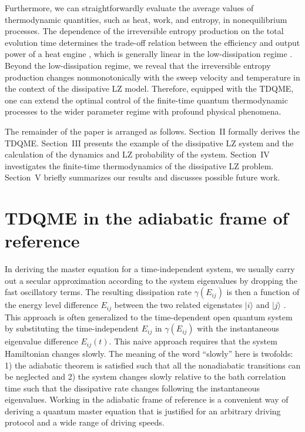 \documentclass[english,nofootinbib, pra, twocolumn,superscriptaddress]{revtex4-1}
\begin{document}
Furthermore, we can straightforwardly evaluate the average values of thermodynamic quantities, such as heat, work, and entropy, in nonequilibrium processes. The dependence of the irreversible
entropy production on the total evolution time determines the trade-off relation between the efficiency and output power of a heat engine \citep{2010.Broeck,2016.Ryabov,2018.Xu}, which is generally linear in the low-dissipation regime
\citep{2012.Tu,2017.Giovannetti,2020.Dong}. Beyond the low-dissipation regime, we reveal that the irreversible entropy production changes nonmonotonically with the sweep velocity and temperature in the context of the dissipative
LZ model. Therefore, equipped with the TDQME, one can extend the optimal control of the finite-time quantum thermodynamic
processes \citep{2020.Perarnau-Llobet} to the wider parameter regime with profound physical phenomena.

The remainder of the paper is arranged as follows. Section~II formally derives
the TDQME. Section~III presents the example of the dissipative LZ system and the calculation of the dynamics and LZ probability of the system. Section~IV investigates the finite-time thermodynamics of the dissipative LZ problem. Section~V briefly summarizes our results and discusses possible future work. 

\section{TDQME in the adiabatic frame of reference}

In deriving the master equation for a time-independent system, we
usually carry out a secular approximation according to the system
eigenvalues by dropping the fast oscillatory terms. The resulting
dissipation rate $\gamma(E_{ij})$ is then a function of the energy level
difference $E_{ij}$ between the two related eigenstates $\vert i\rangle$
and $\vert j\rangle$ \citep{2007.Petruccione}. This approach is
often generalized to the time-dependent open quantum system by substituting
the time-independent $E_{ij}$ in $\gamma(E_{ij})$ with the instantaneous
eigenvalue difference $E_{ij}(t)$. This naive approach requires that
the system Hamiltonian changes slowly. The meaning of the word ``slowly'' here
is twofolds: 1) the adiabatic theorem \citep{1973.Messiah}
is satisfied such that all the nonadiabatic transitions can be neglected and 2) the system changes slowly relative to the bath correlation time such that the dissipative rate changes following the instantaneous
eigenvalues. Working in the adiabatic frame of reference is a convenient way of deriving a quantum master equation that is justified for an arbitrary driving protocol and a wide range of driving speeds. 
\end{document}
